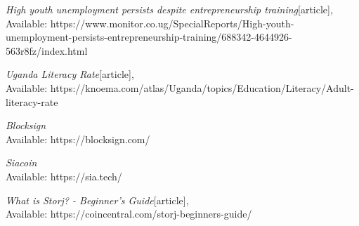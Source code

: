 \begin{thebibliography}{10}
\emph{High youth unemployment persists despite entrepreneurship training}[article],\\
Available: {https://www.monitor.co.ug/SpecialReports/High-youth-unemployment-persists-entrepreneurship-training/688342-4644926-563r8fz/index.html}

\emph{Uganda Literacy Rate}[article],\\
Available: {https://knoema.com/atlas/Uganda/topics/Education/Literacy/Adult-literacy-rate}

\emph{Blocksign}\\
Available: {https://blocksign.com/}

\emph{Siacoin}\\
Available: {https://sia.tech/}

\emph{What is Storj? - Beginner’s Guide}[article],\\
Available: {https://coincentral.com/storj-beginners-guide/}


\end{thebibliography}

